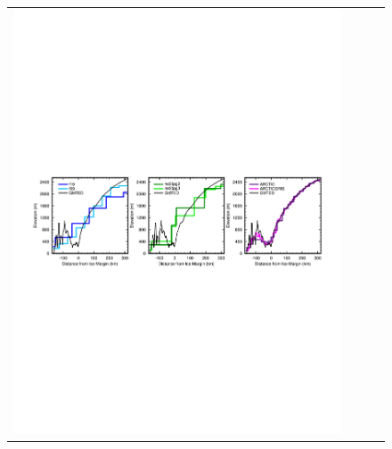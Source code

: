 \documentclass[draft]{agujournal2019}
\begin{document}
\begin{figure}[t]
\begin{center}
\begin{tabular}{cccc}
         \includegraphics[width=130mm]{figs/temp_ktransect.pdf} \\

\end{tabular}
\end{center}
\end{figure}
\end{document}

